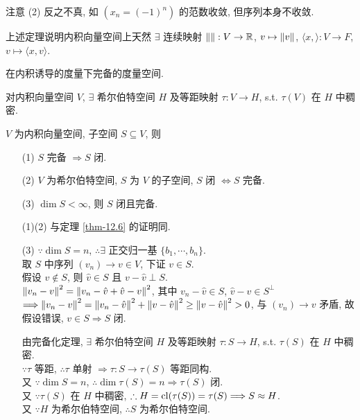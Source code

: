 \documentclass{note}
\begin{document}
注意 (2) 反之不真, 如 $(x_n=(-1)^n)$ 的范数收敛, 但序列本身不收敛.

上述定理说明内积向量空间上天然 $\exists$ 连续映射 $\left\lVert\right\rVert:V\rightarrow\mathbb{R}$, $v\mapsto\left\lVert v\right\rVert$, $\langle x,\rangle:V\rightarrow F$, $v\mapsto\langle x,v\rangle$.

\begin{df}[希尔伯特空间]
    在内积诱导的度量下完备的度量空间.
\end{df}

\begin{thm}
    对内积向量空间 $V$, $\exists$ 希尔伯特空间 $H$ 及等距映射 $\tau:V\rightarrow H$, s.t. $\tau(V)$ 在 $H$ 中稠密.
\end{thm}

\begin{thm}[(课本定理 13.7)]
    $V$ 为内积向量空间, 子空间 $S\subseteq V$, 则
    \begin{itemize}
        \item[(1)] $S$ 完备 $\Longrightarrow S$ 闭.
        \item[(2)] $V$ 为希尔伯特空间, $S$ 为 $V$ 的子空间, $S$ 闭 $\Longleftrightarrow S$ 完备.
        \item[(3)] $\dim S<\infty$, 则 $S$ 闭且完备.
    \end{itemize}
\end{thm}
\begin{pf}
    \begin{itemize}
        \item[(1)(2)] 与定理 \ref{thm-12.6} 的证明同.
        \item[(3)] $\because\dim S=n$, $\therefore\exists$ 正交归一基 $\{b_1,\cdots,b_n\}$.\\
        取 $S$ 中序列 $(v_n)\rightarrow v\in V$, 下证 $v\in S$.\\
        假设 $v\notin S$, 则 $\hat{v}\in S$ 且 $v-\hat{v}\perp S$.\\
        $\left\lVert v_n-v\right\rVert^2=\left\lVert v_n-\hat{v}+\hat{v}-v\right\rVert^2$, 其中 $v_n-\hat{v}\in S$, $\hat{v}-v\in S^{\perp}$\\
        $\Longrightarrow\left\lVert v_n-v\right\rVert^2=\left\lVert v_n-\hat{v}\right\rVert^2+\left\lVert v-\hat{v}\right\rVert^2\geq\left\lVert v-\hat{v}\right\rVert^2>0$, 与 $(v_n)\rightarrow v$ 矛盾, 故假设错误, $v\in S\Longrightarrow S$ 闭.

        由完备化定理, $\exists$ 希尔伯特空间 $H$ 及等距映射 $\tau:S\rightarrow H$, s.t. $\tau(S)$ 在 $H$ 中稠密.\\
        $\because\tau$ 等距, $\therefore\tau$ 单射 $\Longrightarrow\tau:S\rightarrow\tau(S)$ 等距同构.\\
        又 $\because\dim S=n$, $\therefore\dim\tau(S)=n\Longrightarrow\tau(S)$ 闭.\\
        又 $\because\tau(S)$ 在 $H$ 中稠密, $\therefore H=\operatorname{cl}(\tau(S))=\tau(S)\Longrightarrow S\approx H$.\\
        又 $\because H$ 为希尔伯特空间, $\therefore S$ 为希尔伯特空间.
    \end{itemize}
\end{pf}
\end{document}
